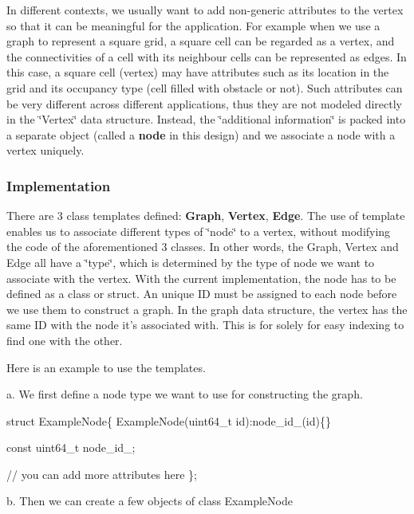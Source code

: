 In different contexts, we usually want to add non-\/generic attributes to the vertex so that it can be meaningful for the application. For example when we use a graph to represent a square grid, a square cell can be regarded as a vertex, and the connectivities of a cell with its neighbour cells can be represented as edges. In this case, a square cell (vertex) may have attributes such as its location in the grid and its occupancy type (cell filled with obstacle or not). Such attributes can be very different across different applications, thus they are not modeled directly in the \char`\"{}\-Vertex\char`\"{} data structure. Instead, the \char`\"{}additional information\char`\"{} is packed into a separate object (called a {\bfseries node} in this design) and we associate a node with a vertex uniquely.

\subsubsection*{Implementation}

There are 3 class templates defined\-: {\bfseries Graph}, {\bfseries Vertex}, {\bfseries Edge}. The use of template enables us to associate different types of \char`\"{}node\char`\"{} to a vertex, without modifying the code of the aforementioned 3 classes. In other words, the Graph, Vertex and Edge all have a \char`\"{}type\char`\"{}, which is determined by the type of node we want to associate with the vertex. With the current implementation, the node has to be defined as a class or struct. An unique I\-D must be assigned to each node before we use them to construct a graph. In the graph data structure, the vertex has the same I\-D with the node it's associated with. This is for solely for easy indexing to find one with the other.

Here is an example to use the templates.

a. We first define a node type we want to use for constructing the graph.


\begin{DoxyCode}
\textcolor{keyword}{struct }ExampleNode\{
    ExampleNode(uint64\_t \textcolor{keywordtype}{id}):node\_id\_(id)\{\}

    \textcolor{keyword}{const} uint64\_t node\_id\_;

    \textcolor{comment}{// you can add more attributes here}
\};
\end{DoxyCode}


b. Then we can create a few objects of class Example\-Node



